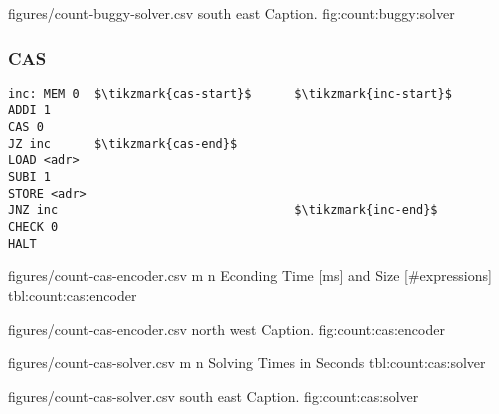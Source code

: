 
\SolverStatsGraph
  {figures/count-buggy-solver.csv}
  {south east}
  {Caption.}
  {fig:count:buggy:solver}

\newpage

\subsubsection*{CAS}

\begin{lstlisting}[style=asm,caption={Consistent counter template.},mathescape,xleftmargin=0.39\textwidth]
inc: MEM 0  $\tikzmark{cas-start}$      $\tikzmark{inc-start}$
ADDI 1
CAS 0
JZ inc      $\tikzmark{cas-end}$
LOAD <adr>
SUBI 1
STORE <adr>
JNZ inc                                 $\tikzmark{inc-end}$
CHECK 0
HALT
\end{lstlisting}


\EncoderStatsTable
  {figures/count-cas-encoder.csv}
  {m n}
  {\CountRowHeader}
  {Econding Time [ms] and Size [\#expressions]}
  {tbl:count:cas:encoder}

\EncoderStatsGraph
  {figures/count-cas-encoder.csv}
  {north west}
  {Caption.}
  {fig:count:cas:encoder}

\newpage
{}

\SolverStatsTable
  {figures/count-cas-solver.csv}
  {m n}
  {\CountRowHeader}
  {Solving Times in Seconds}
  {tbl:count:cas:solver}

\SolverStatsGraph
  {figures/count-cas-solver.csv}
  {south east}
  {Caption.}
  {fig:count:cas:solver}
